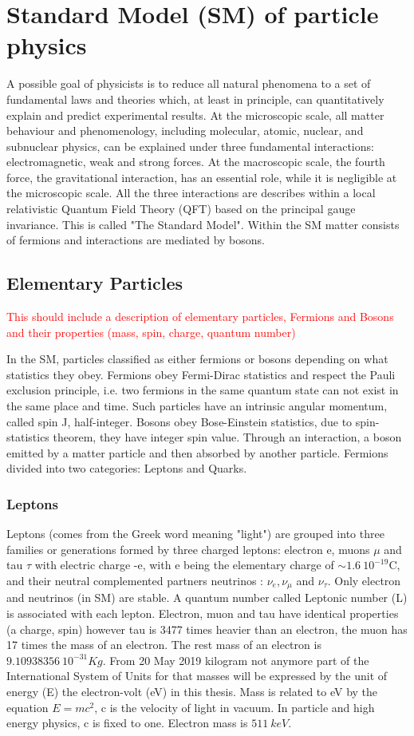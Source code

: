 \section{Standard Model (SM) of particle physics}
\label{chap1:SM}
A possible goal of physicists is to reduce all natural phenomena to a set of fundamental laws and theories which, at least in principle, can quantitatively explain and predict experimental results. At the microscopic scale, all matter behaviour and phenomenology, including molecular, atomic, nuclear, and subnuclear physics, can be explained under three fundamental interactions: electromagnetic, weak and strong forces. At the macroscopic scale, the fourth force, the gravitational interaction, has an essential role, while it is negligible at the microscopic scale. All the three interactions are describes within a local relativistic Quantum Field Theory (QFT) based on the principal gauge invariance. This is called "The Standard Model". Within the SM matter consists of fermions and interactions are mediated by bosons. 

\subsection{Elementary Particles}
\label{chap1:SM:EP}
\textcolor{red}{
This should include a description of elementary particles, Fermions and  Bosons and their properties (mass, spin, charge, quantum number)
\\ }

In the SM, particles classified as either fermions or bosons depending on what statistics they obey. Fermions obey Fermi-Dirac statistics and respect the Pauli exclusion principle, i.e. two fermions in the same quantum state can not exist in the same place and time. Such particles have an intrinsic angular momentum, called spin J, half-integer. Bosons obey Bose-Einstein statistics, due to spin-statistics theorem, they have integer spin value. Through an interaction, a boson emitted by a matter particle and then absorbed by another particle. Fermions divided into two categories: Leptons and Quarks.
\subsubsection{Leptons}
Leptons (comes from the Greek word meaning "light") are grouped into three families or generations formed by three charged leptons: electron e, muons $\mu$ and tau $\tau$ with electric charge -e, with e being the elementary charge of $\sim 1.6 \ 10^{-19} $C, and their neutral complemented partners neutrinos : $\nu_{e}, \nu_{\mu}$ and $\nu_{\tau}$. Only electron and neutrinos (in SM) are stable. A quantum number called Leptonic number (L) is associated with each lepton. Electron, muon and tau have identical properties (a charge, spin) however tau is 3477 times heavier than an electron, the muon has 17 times the mass of an electron. The rest mass of an electron is $9.10938356 \ 10^{-31} Kg$. From 20 May 2019 kilogram not anymore part of the International System of Units for that masses will be expressed by the unit of energy (E) the electron-volt (eV) in this thesis. Mass is related to eV by the equation $E=mc^2$, c is the velocity of light in vacuum. In particle and high energy physics, c is fixed to one. Electron mass is $511 \ keV$.

